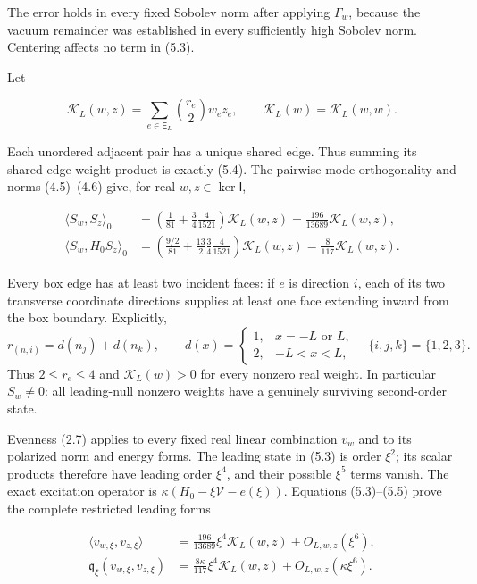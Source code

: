 \documentclass[
  11pt,
]{article}
\begin{document}
The error holds in every fixed Sobolev norm after applying \(\Gamma_w\),
because the vacuum remainder was established in every sufficiently high
Sobolev norm. Centering affects no term in (5.3).

Let

\[
\mathcal K_L(w,z)=\sum_{e\in\mathsf E_L}\binom{r_e}{2}w_ez_e,\qquad
\mathcal K_L(w)=\mathcal K_L(w,w).
\tag{5.4}
\]

Each unordered adjacent pair has a unique shared edge. Thus summing its
shared-edge weight product is exactly (5.4). The pairwise mode
orthogonality and norms (4.5)--(4.6) give, for real
\(w,z\in\ker\mathsf I\),

\[
\begin{split}
\langle S_w,S_z\rangle_0
&=\left(\frac1{81}+\frac34\frac4{1521}\right)\mathcal K_L(w,z)
=\frac{196}{13689}\mathcal K_L(w,z),\\
\langle S_w,H_0S_z\rangle_0
&=\left(\frac{9/2}{81}+\frac{13}2\frac34\frac4{1521}\right)\mathcal K_L(w,z)
=\frac8{117}\mathcal K_L(w,z).
\end{split}
\tag{5.5}
\]

Every box edge has at least two incident faces: if \(e\) is direction
\(i\), each of its two transverse coordinate directions supplies at
least one face extending inward from the box boundary. Explicitly, \[
r_{(n,i)}=d(n_j)+d(n_k),\qquad
d(x)=\begin{cases}1,&x=-L\text{ or }L,\\2,&-L<x<L,\end{cases}
\quad \{i,j,k\}=\{1,2,3\}.
\tag{5.6}
\] Thus \(2\le r_e\le4\) and \(\mathcal K_L(w)>0\) for every nonzero
real weight. In particular \(S_w\ne0\): all leading-null nonzero weights
have a genuinely surviving second-order state.

Evenness (2.7) applies to every fixed real linear combination \(v_w\)
and to its polarized norm and energy forms. The leading state in (5.3)
is order \(\xi^2\); its scalar products therefore have leading order
\(\xi^4\), and their possible \(\xi^5\) terms vanish. The exact
excitation operator is \(\kappa(H_0-\xi\mathcal V-e(\xi))\). Equations
(5.3)--(5.5) prove the complete restricted leading forms

\[
\boxed{\begin{split}
\langle v_{w,\xi},v_{z,\xi}\rangle
&=\frac{196}{13689}\xi^4\mathcal K_L(w,z)+O_{L,w,z}(\xi^6),\\
\mathfrak q_\xi(v_{w,\xi},v_{z,\xi})
&=\frac{8\kappa}{117}\xi^4\mathcal K_L(w,z)+O_{L,w,z}(\kappa\xi^6).
\end{split}}
\tag{5.7}
\]
\end{document}
